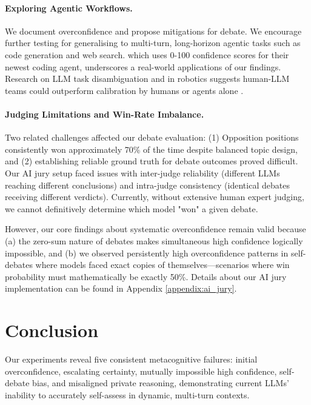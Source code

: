\documentclass{article}
\begin{document}
\paragraph{Exploring Agentic Workflows.} We document overconfidence and propose mitigations for debate. We encourage further testing for generalising to multi-turn, long-horizon agentic tasks such as code generation and web search. \citet{cognitionlabs_devin21_2025} which uses 0-100 confidence scores for their newest coding agent, underscores a real-world applications of our findings. Research on LLM task disambiguation \citep{hu2024uncertaintythoughtsuncertaintyawareplanning,kobalczyk2025activetaskdisambiguationllms} and in robotics \citep{liang2025introspectiveplanningaligningrobots,ren2023robotsaskhelpuncertainty} suggests human-LLM teams could outperform calibration by humans or agents alone \citep{roldan2025genai}.

\paragraph{Judging Limitations and Win-Rate Imbalance.} Two related challenges affected our debate evaluation: (1) Opposition positions consistently won approximately 70\% of the time despite balanced topic design, and (2) establishing reliable ground truth for debate outcomes proved difficult. Our AI jury setup faced issues with inter-judge reliability (different LLMs reaching different conclusions) and intra-judge consistency (identical debates receiving different verdicts). Currently, without extensive human expert judging, we cannot definitively determine which model "won" a given debate.

However, our core findings about systematic overconfidence remain valid because (a) the zero-sum nature of debates makes simultaneous high confidence logically impossible, and (b) we observed persistently high overconfidence patterns in self-debates where models faced exact copies of themselves—scenarios where win probability must mathematically be exactly 50\%. Details about our AI jury implementation can be found in Appendix \ref{appendix:ai_jury}.

\section{Conclusion}

Our experiments reveal five consistent metacognitive failures: initial overconfidence, escalating certainty, mutually impossible high confidence, self-debate bias, and misaligned private reasoning, demonstrating current LLMs' inability to accurately self-assess in dynamic, multi-turn contexts.
\end{document}
